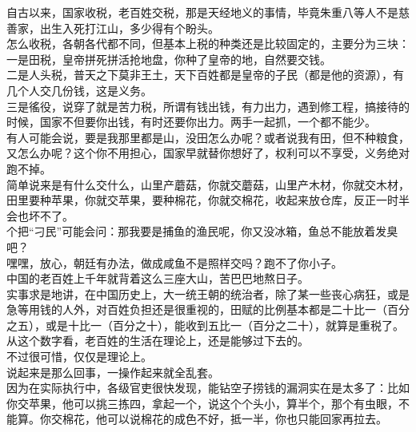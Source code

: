 \begin{multicols}{\theparacolNo}
自古以来，国家收税，老百姓交税，那是天经地义的事情，毕竟朱重八等人不是慈善家，出生入死打江山，多少得有个盼头。\\

怎么收税，各朝各代都不同，但基本上税的种类还是比较固定的，主要分为三块：\\

一是田税，皇帝拼死拼活抢地盘，你种了皇帝的地，自然要交钱。\\

二是人头税，普天之下莫非王土，天下百姓都是皇帝的子民（都是他的资源），有几个人交几份钱，这是义务。\\

三是徭役，说穿了就是苦力税，所谓有钱出钱，有力出力，遇到修工程，搞接待的时候，国家不但要你出钱，有时还要你出力。两手一起抓，一个都不能少。\\

有人可能会说，要是我那里都是山，没田怎么办呢？或者说我有田，但不种粮食，又怎么办呢？这个你不用担心，国家早就替你想好了，权利可以不享受，义务绝对跑不掉。\\

简单说来是有什么交什么，山里产蘑菇，你就交蘑菇，山里产木材，你就交木材，田里要种苹果，你就交苹果，要种棉花，你就交棉花，收起来放仓库，反正一时半会也坏不了。\\

个把“刁民”可能会问：那我要是捕鱼的渔民呢，你又没冰箱，鱼总不能放着发臭吧？\\

嘿嘿，放心，朝廷有办法，做成咸鱼不是照样交吗？跑不了你小子。\\

中国的老百姓上千年就背着这么三座大山，苦巴巴地熬日子。\\

实事求是地讲，在中国历史上，大一统王朝的统治者，除了某一些丧心病狂，或是急等用钱的人外，对百姓负担还是很重视的，田赋的比例基本都是二十比一（百分之五），或是十比一（百分之十），能收到五比一（百分之二十），就算是重税了。\\

从这个数字看，老百姓的生活在理论上，还是能够过下去的。\\

不过很可惜，仅仅是理论上。\\

说起来是那么回事，一操作起来就全乱套。\\

因为在实际执行中，各级官吏很快发现，能钻空子捞钱的漏洞实在是太多了：比如你交苹果，他可以挑三拣四，拿起一个，说这个个头小，算半个，那个有虫眼，不能算。你交棉花，他可以说棉花的成色不好，抵一半，你也只能回家再拉去。\\


\end{multicols}
